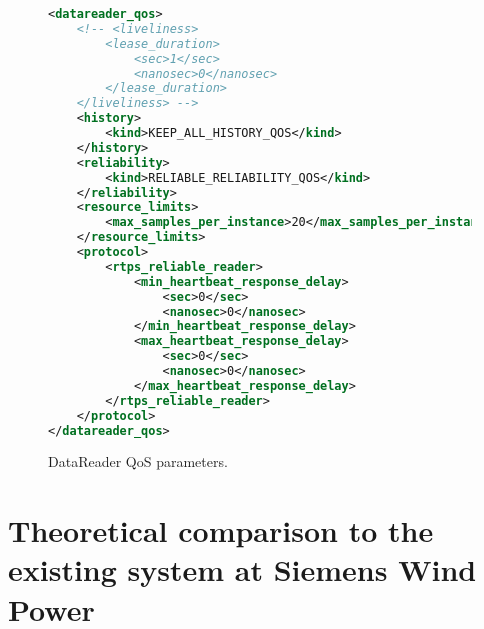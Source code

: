 \begin{figure}
\begin{lstlisting}[language=XML]
<datareader_qos>
	<!-- <liveliness>
		<lease_duration>
			<sec>1</sec>
			<nanosec>0</nanosec>
		</lease_duration>
	</liveliness> -->
	<history>
		<kind>KEEP_ALL_HISTORY_QOS</kind>
	</history>
	<reliability>
		<kind>RELIABLE_RELIABILITY_QOS</kind>
	</reliability>
	<resource_limits>
		<max_samples_per_instance>20</max_samples_per_instance>
	</resource_limits>
	<protocol>
		<rtps_reliable_reader>
			<min_heartbeat_response_delay>
				<sec>0</sec>
				<nanosec>0</nanosec>
			</min_heartbeat_response_delay>
			<max_heartbeat_response_delay>
				<sec>0</sec>
				<nanosec>0</nanosec>
			</max_heartbeat_response_delay>
		</rtps_reliable_reader>
	</protocol>
</datareader_qos>
\end{lstlisting}
\caption[DataReader QoS parameters]{
		\label{fig:readerQoS} 
		\footnotesize{DataReader QoS parameters.}
	}
\end{figure}


\section{Theoretical comparison to the existing system at Siemens Wind Power}
